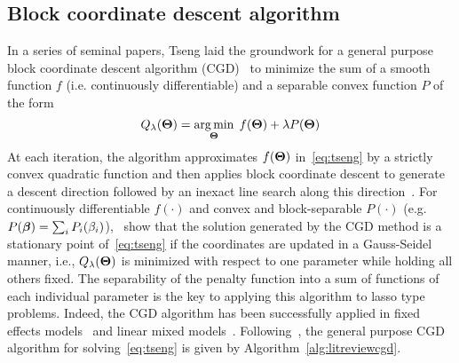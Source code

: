 \subsection{Block coordinate descent algorithm} \label{subsec:cgd}

In a series of seminal papers, Tseng laid the groundwork for a general purpose block coordinate descent algorithm (CGD)~\citep{tseng2009coordinate,tseng1988coordinate,tseng2001convergence} to minimize the sum of a smooth function $f$ (i.e. continuously differentiable) and a separable convex function $P$ of the form
\begin{equation}
Q_{\lambda}(\boldsymbol{\Theta}) = \operatorname*{arg\,min}_{\boldsymbol{\Theta}}\; f(\boldsymbol{\Theta}) + \lambda P(\boldsymbol{\Theta}) \label{eq:tseng}
\end{equation}
At each iteration, the algorithm approximates $f(\boldsymbol{\Theta})$ in~\eqref{eq:tseng} by a strictly convex quadratic function and then applies block coordinate descent to generate a descent direction followed by an inexact line search along this direction~\citep{tseng2009coordinate}. 
For continuously differentiable $f(\cdot)$ and convex and block-separable $P(\cdot)$ \mbox{(e.g. $P(\boldsymbol{\beta}) = \sum_i P_i (\beta_i)$)},~\cite{tseng2009coordinate} show that the solution generated by the CGD method is a stationary point of~\eqref{eq:tseng} if the coordinates are updated in a Gauss-Seidel manner, i.e., $Q_{\lambda}(\boldsymbol{\Theta})$ is minimized with respect to one parameter while holding all others fixed. 
The separability of the penalty function into a sum of functions of each individual parameter is the key to applying this algorithm to lasso type problems. 
Indeed, the CGD algorithm has been successfully applied in fixed effects models~\citep{meier2008group,friedman2010regularization} and linear mixed models~\citep{schelldorfer2011estimation}. Following~\cite{tseng2009coordinate}, the general purpose CGD algorithm for solving~\eqref{eq:tseng} is given by Algorithm~\ref{alg:litreviewcgd}. 

